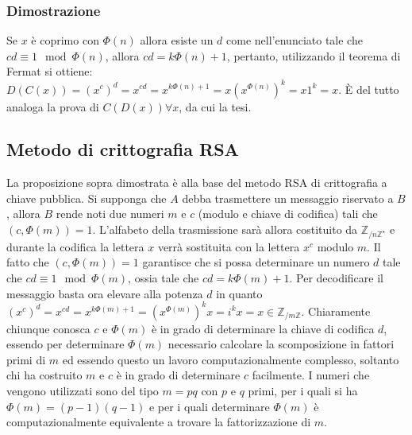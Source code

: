 \subsubsection{Dimostrazione}
Se $x$ \`e coprimo con $\Phi(n)$ allora esiste un $d$ come nell'enunciato tale che $cd\equiv 1\mod\Phi(n)$, allora $cd=k\Phi(n)+1$, pertanto, utilizzando il teorema di 
Fermat si ottiene: $D(C(x))=(x^c)^d=x^{cd}=x^{k\Phi(n)+1}=x(x^{\Phi(n)})^k=x1^k=x$. \`E del tutto analoga la prova di $C(D(x))\forall x$, da cui la tesi.
\subsection{Metodo di crittografia RSA}
La proposizione sopra dimostrata \`e alla base del metodo RSA di crittografia a chiave pubblica. Si supponga che $A$ debba trasmettere un messaggio riservato a $B$, allora
$B$ rende noti due numeri $m$ e $c$ (modulo e chiave di codifica) tali che $(c,\Phi(m))=1$. L'alfabeto della trasmissione sar\`a allora costituito da $\mathbb{Z}_{/n\mathbb{Z}^
\star}$ e durante la codifica la lettera $x$ verr\`a sostituita con la lettera $x^c$ modulo $m$. Il fatto che $(c,\Phi(m))=1$ garantisce che si possa determinare un numero $d$
tale che $cd\equiv 1\mod \Phi(m)$, ossia tale che $cd=k\Phi(m)+1$. Per decodificare il messaggio basta ora elevare alla potenza $d$ in quanto $(x^c)^d=x^{cd}=x^{k\Phi(m)+1}=
(x^{\Phi(m)})^kx=i^kx=x\in\mathbb{Z}_{/m\mathbb{Z}}$. Chiaramente chiunque conosca $c$ e $\Phi(m)$ \`e in grado di determinare la chiave di codifica $d$, essendo per 
determinare $\Phi(m)$ necessario calcolare la scomposizione in fattori primi di $m$ ed essendo questo un lavoro computazionalmente complesso, soltanto chi ha costruito $m$ e 
$c$ \`e in grado di determinare $c$ facilmente. I numeri che vengono utilizzati sono del tipo $m=pq$ con $p$ e $q$ primi, per i quali si ha $\Phi(m)=(p-1)(q-1)$ e per i quali
determinare $\Phi(m)$ \`e computazionalmente equivalente a trovare la fattorizzazione di $m$.
 